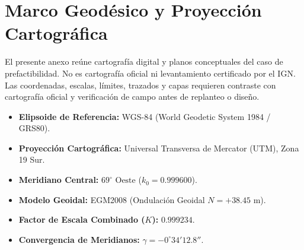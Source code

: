 \documentclass[11pt,a4paper]{report}
\begin{document}
\section{Marco Geodésico y Proyección Cartográfica}
El presente anexo reúne cartografía digital y planos conceptuales del caso de prefactibilidad. No es cartografía oficial ni levantamiento certificado por el IGN. Las coordenadas, escalas, límites, trazados y capas requieren contraste con cartografía oficial y verificación de campo antes de replanteo o diseño.
\begin{itemize}
    \item \textbf{Elipsoide de Referencia:} WGS-84 (World Geodetic System 1984 / GRS80).
    \item \textbf{Proyección Cartográfica:} Universal Transversa de Mercator (UTM), Zona 19 Sur.
    \item \textbf{Meridiano Central:} $69^\circ\text{ Oeste}$ ($k_0 = 0.999600$).
    \item \textbf{Modelo Geoidal:} EGM2008 (Ondulación Geoidal $N = +38.45\text{ m}$).
    \item \textbf{Factor de Escala Combinado ($K$):} $0.999234$.
    \item \textbf{Convergencia de Meridianos:} $\gamma = -0^\circ 34' 12.8''$.
\end{itemize}
\end{document}
